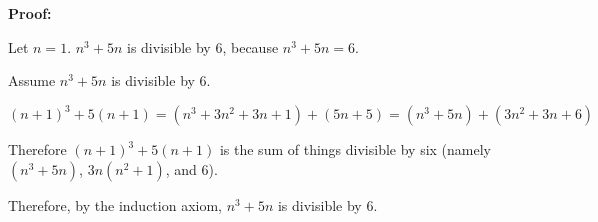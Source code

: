 \documentclass[12pt,letterpaper]{article}
\begin{document}
\begin{enumerate}[leftmargin=0cm]
{\textbf{Proof:}

Let $n = 1$. $n^3 + 5n$ is divisible by $6$, because $n^3 + 5n = 6$.

Assume $n^3 + 5n$ is divisible by $6$.

$(n+1)^3 + 5(n+1) = (n^3 + 3n^2 + 3n + 1) + (5n + 5) = (n^3 + 5n) + (3n^2 + 3n + 6)$

Therefore $(n+1)^3 + 5(n+1)$ is the sum of things divisible by six (namely $(n^3 + 5n)$, $3n(n^2 + 1)$, and $6$).

Therefore, by the induction axiom, $n^3 + 5n$ is divisible by $6$.
}

\end{enumerate}
\end{document}
